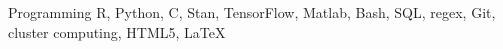 

\begin{cvskills}

  \cvskill
    {Programming} %
    {R, Python, C, Stan, TensorFlow, Matlab, Bash, SQL, regex, Git, cluster computing, HTML5, \LaTeX} %

\end{cvskills}
